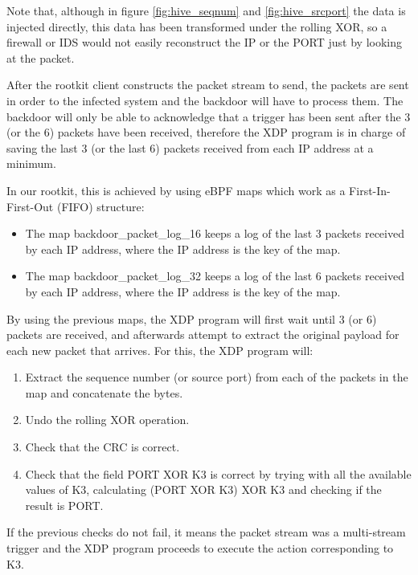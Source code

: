 Note that, although in figure \ref{fig:hive_seqnum} and \ref{fig:hive_srcport} the data is injected directly, this data has been transformed under the rolling XOR, so a firewall or IDS would not easily reconstruct the IP or the PORT just by looking at the packet.

After the rootkit client constructs the packet stream to send, the packets are sent in order to the infected system and the backdoor will have to process them. The backdoor will only be able to acknowledge that a trigger has been sent after the 3 (or the 6) packets have been received, therefore the XDP program is in charge of saving the last 3 (or the last 6) packets received from each IP address at a minimum.

In our rootkit, this is achieved by using eBPF maps which work as a First-In-First-Out (FIFO) structure:
\begin{itemize}
\item The map backdoor\_packet\_log\_16 keeps a log of the last 3 packets received by each IP address, where the IP address is the key of the map.
\item The map backdoor\_packet\_log\_32 keeps a log of the last 6 packets received by each IP address, where the IP address is the key of the map.
\end{itemize}

By using the previous maps, the XDP program will first wait until 3 (or 6) packets are received, and afterwards attempt to extract the original payload for each new packet that arrives. For this, the XDP program will:
\begin{enumerate}
\item Extract the sequence number (or source port) from each of the packets in the map and concatenate the bytes.
\item Undo the rolling XOR operation.
\item Check that the CRC is correct.
\item Check that the field PORT XOR K3 is correct by trying with all the available values of K3, calculating (PORT XOR K3) XOR K3 and checking if the result is PORT.
\end{enumerate}

If the previous checks do not fail, it means the packet stream was a multi-stream trigger and the XDP program proceeds to execute the action corresponding to K3.



